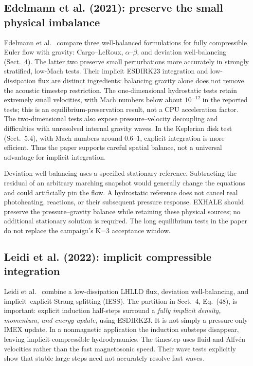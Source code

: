 \documentclass[english,a4paper]{my_memo}
\begin{document}
\subsection{Edelmann et al. (2021): preserve the small physical imbalance}
Edelmann et al.\ \cite{edelmann} compare three well-balanced formulations for fully compressible Euler flow with gravity: Cargo--LeRoux, $\alpha$--$\beta$, and deviation well-balancing (Sect.~4). The latter two preserve small perturbations more accurately in strongly stratified, low-Mach tests. Their implicit ESDIRK23 integration and low-dissipation flux are distinct ingredients: balancing gravity alone does not remove the acoustic timestep restriction. The one-dimensional hydrostatic tests retain extremely small velocities, with Mach numbers below about $10^{-12}$ in the reported tests; this is an equilibrium-preservation result, not a CPU acceleration factor. The two-dimensional tests also expose pressure--velocity decoupling and difficulties with unresolved internal gravity waves. In the Keplerian disk test (Sect.~5.4), with Mach numbers around 0.6--1, explicit integration is more efficient. Thus the paper supports careful spatial balance, not a universal advantage for implicit integration.

Deviation well-balancing uses a specified stationary reference. Subtracting the residual of an arbitrary marching snapshot would generally change the equations and could artificially pin the flow. A hydrostatic reference does not cancel real photoheating, reactions, or their subsequent pressure response. EXHALE should preserve the pressure--gravity balance while retaining these physical sources; no additional stationary solution is required. The long equilibrium tests in the paper do not replace the campaign's K=3 acceptance window. 

\subsection{Leidi et al. (2022): implicit compressible integration}
Leidi et al.\ \cite{leidi} combine a low-dissipation LHLLD flux, deviation well-balancing, and implicit--explicit Strang splitting (IESS). The partition in Sect.~4, Eq.~(48), is important: explicit induction half-steps surround a \emph{fully implicit density, momentum, and energy update}, using ESDIRK23. It is not simply a pressure-only IMEX update. In a nonmagnetic application the induction substeps disappear, leaving implicit compressible hydrodynamics. The timestep uses fluid and Alfv\'en velocities rather than the fast magnetosonic speed. Their wave tests explicitly show that stable large steps need not accurately resolve fast waves.
\end{document}
